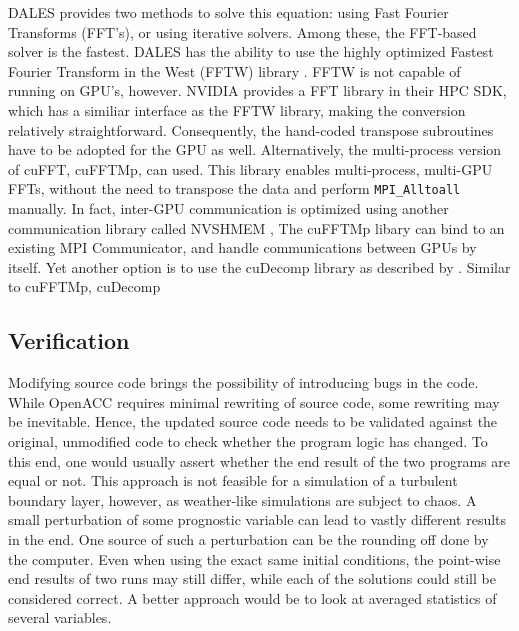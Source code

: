  DALES provides two methods to solve this equation: using Fast Fourier Transforms (FFT's), or using iterative solvers. Among these, the FFT-based solver is the fastest. DALES has the ability to use the highly optimized Fastest Fourier Transform in the West (FFTW) library \citep{FFTW97}. FFTW is not capable of running on GPU's, however. NVIDIA provides a FFT library in their HPC SDK, which has a similiar interface as the FFTW library, making the conversion relatively straightforward. Consequently, the hand-coded transpose subroutines have to be adopted for the GPU as well. Alternatively, the multi-process version of cuFFT, cuFFTMp, can used. This library enables multi-process, multi-GPU FFTs, without the need to transpose the data and perform \texttt{MPI\_Alltoall} manually. In fact, inter-GPU communication is optimized using another communication library called NVSHMEM ,  The cuFFTMp libary can bind to an existing MPI Communicator, and handle communications between GPUs by itself. Yet another option is to use the cuDecomp library as described by \citet{romeroDistributedmemorySimulationsTurbulent2022}. Similar to cuFFTMp, cuDecomp 

\subsection{Verification}
Modifying source code brings the possibility of introducing bugs in the code. While OpenACC requires minimal rewriting of source code, some rewriting may be inevitable. Hence, the updated source code needs to be validated against the original, unmodified code to check whether the program logic has changed. To this end, one would usually assert whether the end result of the two programs are equal or not. This approach is not feasible for a simulation of a turbulent boundary layer, however, as weather-like simulations are subject to chaos. A small perturbation of some prognostic variable can lead to vastly different results in the end. One source of such a perturbation can be the rounding off done by the computer. Even when using the exact same initial conditions, the point-wise end results of two runs may still differ, while each of the solutions could still be considered correct. A better approach would be to look at averaged statistics of several variables. 

